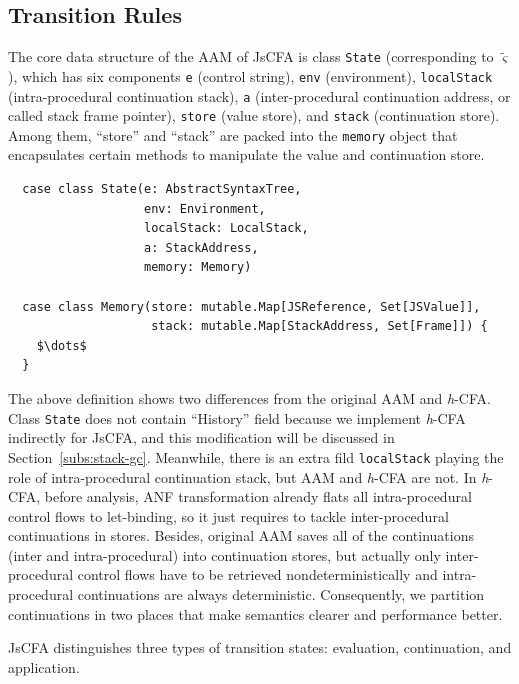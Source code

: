 \documentclass{article}
\begin{document}
\subsection{Transition Rules}
\label{sub:Transition}

The core data structure of the AAM of JsCFA is class \verb|State| (corresponding to $\tilde{\varsigma}$), which has six components \verb|e| (control string), \verb|env| (environment), \verb|localStack| (intra-procedural continuation stack), \verb|a| (inter-procedural continuation address, or called stack frame pointer), \verb|store| (value store), and \verb|stack| (continuation store). Among them, ``store'' and ``stack'' are packed into the \verb|memory| object that encapsulates certain methods to manipulate the value and continuation store.

\lstset{language=Scala, mathescape}
\begin{lstlisting}
  case class State(e: AbstractSyntaxTree,
                   env: Environment,
                   localStack: LocalStack,
                   a: StackAddress,
                   memory: Memory)

  case class Memory(store: mutable.Map[JSReference, Set[JSValue]],
                    stack: mutable.Map[StackAddress, Set[Frame]]) {
    $\dots$
  }
\end{lstlisting}

The above definition shows two differences from the original AAM and \textit{h}-CFA\@. Class \verb|State| does not contain ``History'' field because we implement \textit{h}-CFA indirectly for JsCFA, and this modification will be discussed in Section~\ref{subs:stack-gc}.
Meanwhile, there is an extra fild \verb|localStack| playing the role of intra-procedural continuation stack, but AAM and \textit{h}-CFA are not. In \textit{h}-CFA, before analysis, ANF transformation already flats all intra-procedural control flows to let-binding, so it just requires to tackle inter-procedural continuations in stores. Besides, original AAM saves all of the continuations (inter and intra-procedural) into continuation stores, but actually only inter-procedural control flows have to be retrieved nondeterministically and intra-procedural continuations are always deterministic.
Consequently, we partition continuations in two places that make semantics clearer and performance better.

JsCFA distinguishes three types of transition states: evaluation, continuation, and application.
\end{document}
